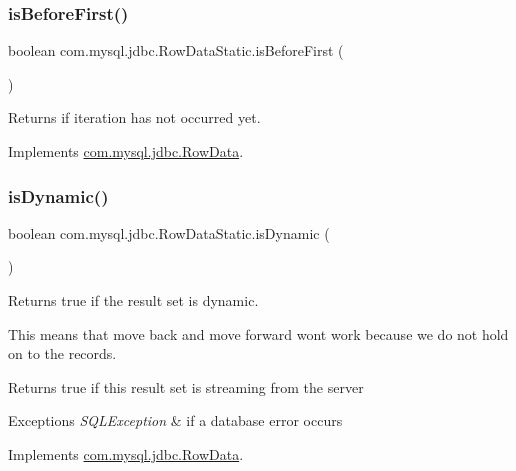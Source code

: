 \subsubsection{\texorpdfstring{is\+Before\+First()}{isBeforeFirst()}}
{\footnotesize\ttfamily boolean com.\+mysql.\+jdbc.\+Row\+Data\+Static.\+is\+Before\+First (\begin{DoxyParamCaption}{ }\end{DoxyParamCaption})}

Returns if iteration has not occurred yet. 

Implements \mbox{\hyperlink{interfacecom_1_1mysql_1_1jdbc_1_1_row_data_ae315d5317b29387492173d1e808b65d5}{com.\+mysql.\+jdbc.\+Row\+Data}}.

\mbox{\label{classcom_1_1mysql_1_1jdbc_1_1_row_data_static_a4134efd887590ba3a57bb862079c7491}} 
\subsubsection{\texorpdfstring{is\+Dynamic()}{isDynamic()}}
{\footnotesize\ttfamily boolean com.\+mysql.\+jdbc.\+Row\+Data\+Static.\+is\+Dynamic (\begin{DoxyParamCaption}{ }\end{DoxyParamCaption})}

Returns true if the result set is dynamic.

This means that move back and move forward won\textquotesingle{}t work because we do not hold on to the records.

\begin{DoxyReturn}{Returns}
true if this result set is streaming from the server 
\end{DoxyReturn}

\begin{DoxyExceptions}{Exceptions}
{\em S\+Q\+L\+Exception} & if a database error occurs \\
\hline
\end{DoxyExceptions}


Implements \mbox{\hyperlink{interfacecom_1_1mysql_1_1jdbc_1_1_row_data_a0205c4297c795afb968d714a56272e01}{com.\+mysql.\+jdbc.\+Row\+Data}}.

\mbox{\label{classcom_1_1mysql_1_1jdbc_1_1_row_data_static_ab306d052b3e0acc34495b3f2ab9ca5ce}} 
